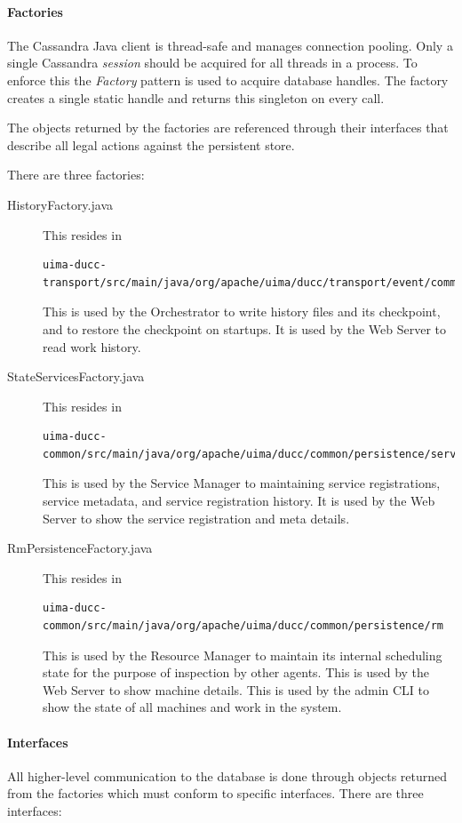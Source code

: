    \paragraph{Factories}
    The Cassandra Java client is thread-safe and manages connection pooling.  Only a single
    Cassandra {\em session} should be acquired for all threads in a process.  To enforce this
    the {\em Factory} pattern is used to acquire database handles.  The factory creates
    a single static handle and returns this singleton on every call.

    The objects returned by the factories are referenced through their interfaces that describe all
    legal actions against the persistent store. 

    There are three factories:
    \begin{description}
      \item[HistoryFactory.java] This resides in 
\begin{verbatim}
uima-ducc-transport/src/main/java/org/apache/uima/ducc/transport/event/common/history
\end{verbatim}
        This is used by the Orchestrator to write history files and its checkpoint, and to restore
        the checkpoint on startups.  It is used by the Web Server to read work history.
      \item[StateServicesFactory.java] This resides in 
\begin{verbatim}
uima-ducc-common/src/main/java/org/apache/uima/ducc/common/persistence/services
\end{verbatim}
        This is used by the Service Manager to maintaining service registrations, service metadata,
        and service registration history.  It is used by the Web Server to show the service
        registration and meta details.
      \item[RmPersistenceFactory.java] This resides in
\begin{verbatim}
uima-ducc-common/src/main/java/org/apache/uima/ducc/common/persistence/rm 
\end{verbatim}
        This is used by the Resource Manager to maintain its internal scheduling state for the
        purpose of inspection by other agents.  This is used by the Web Server to show machine
        details.  This is used by the admin CLI to show the state of all machines and work in the
        system.
    \end{description}
    
    \paragraph{Interfaces}
    All higher-level communication to the database is done through objects returned from the
    factories which must conform to specific interfaces.  There are three interfaces:
    
